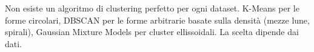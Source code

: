 \begin{notebox}
Non esiste un algoritmo di clustering perfetto per ogni dataset. K-Means per le forme circolari, DBSCAN per le forme arbitrarie basate sulla densità (mezze lune, spirali), Gaussian Mixture Models per cluster ellissoidali. La scelta dipende dai dati.
\end{notebox}